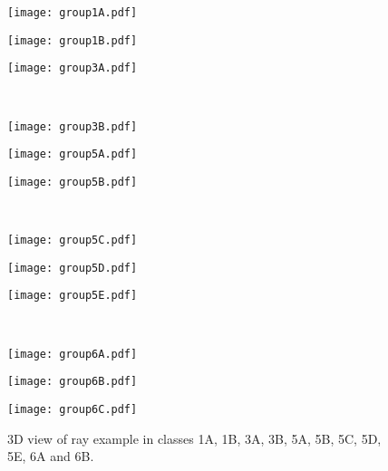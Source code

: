\begin{figure}[htps]
\centering
\begin{minipage}[c]{0.325\textwidth}
\texttt{[image: group1A.pdf]}
\end{minipage}
\begin{minipage}[c]{0.325\textwidth}
\texttt{[image: group1B.pdf]}
\end{minipage}
\begin{minipage}[c]{0.325\textwidth}
\texttt{[image: group3A.pdf]}
\end{minipage}\\

\begin{minipage}[c]{0.325\textwidth}
\texttt{[image: group3B.pdf]}
\end{minipage}
\begin{minipage}[c]{0.325\textwidth}
\texttt{[image: group5A.pdf]}
\end{minipage}
\begin{minipage}[c]{0.325\textwidth}
\texttt{[image: group5B.pdf]}
\end{minipage}\\

\begin{minipage}[c]{0.325\textwidth}
\texttt{[image: group5C.pdf]}
\end{minipage}
\begin{minipage}[c]{0.325\textwidth}
\texttt{[image: group5D.pdf]}
\end{minipage}
\begin{minipage}[c]{0.325\textwidth}
\texttt{[image: group5E.pdf]}
\end{minipage}\\

\begin{minipage}[c]{0.325\textwidth}
\texttt{[image: group6A.pdf]}
\end{minipage}
\begin{minipage}[c]{0.325\textwidth}
\texttt{[image: group6B.pdf]}
\end{minipage}
\begin{minipage}[c]{0.325\textwidth}
\texttt{[image: group6C.pdf]}
\end{minipage}

\caption{3D view of ray example in classes 1A, 1B, 3A, 3B, 5A, 5B, 5C, 5D, 5E, 6A and 6B.}
\label{fig:modelClass3D1}
\end{figure}



